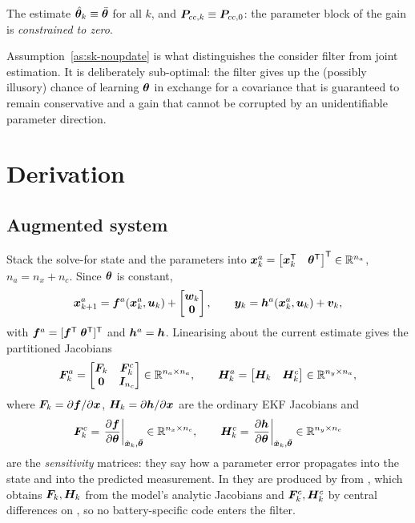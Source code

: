 \begin{assumption}\label{as:sk-noupdate}
The estimate $\hat{\bm{\theta}}_k \equiv \bar{\bm{\theta}}$ for all $k$, and
$\bm{P}_{cc,k}\equiv\bm{P}_{cc,0}$: the parameter block of the gain is \emph{constrained to zero}.
\end{assumption}

Assumption~\ref{as:sk-noupdate} is what distinguishes the consider filter from joint estimation.
It is deliberately sub-optimal: the filter gives up the (possibly illusory) chance of learning
$\bm{\theta}$ in exchange for a covariance that is guaranteed to remain conservative and a gain that
cannot be corrupted by an unidentifiable parameter direction.

\section{Derivation}

\subsection{Augmented system}
Stack the solve-for state and the parameters into
$\bm{x}^a_k = \begin{bmatrix}\bm{x}_k^{\mathsf{T}} & \bm{\theta}^{\mathsf{T}}\end{bmatrix}^{\mathsf{T}} \in \mathbb{R}^{n_a}$,
$n_a = n_x+n_c$.  Since $\bm{\theta}$ is constant,
\begin{equation}
\bm{x}^a_{k+1} = \bm{f}^a(\bm{x}^a_k,\bm{u}_k) + \begin{bmatrix}\bm{w}_k\\ \bm 0\end{bmatrix},
\qquad
\bm{y}_k = \bm{h}^a(\bm{x}^a_k,\bm{u}_k) + \bm{v}_k,
\label{eq:sk-aug}
\end{equation}
with $\bm{f}^a = [\bm{f}^{\mathsf{T}}\;\bm{\theta}^{\mathsf{T}}]^{\mathsf{T}}$ and $\bm{h}^a = \bm{h}$.  Linearising about the current estimate
gives the partitioned Jacobians
\begin{equation}
\bm{F}^a_k = \begin{bmatrix} \bm{F}_k & \bm{F}^{c}_k \\ \bm 0 & \bm{I}_{n_c}\end{bmatrix}
   \in\mathbb{R}^{n_a\times n_a},
\qquad
\bm{H}^a_k = \begin{bmatrix} \bm{H}_k & \bm{H}^{c}_k \end{bmatrix} \in\mathbb{R}^{n_y\times n_a},
\label{eq:sk-jac}
\end{equation}
where $\bm{F}_k=\partial\bm{f}/\partial\bm{x}$, $\bm{H}_k=\partial\bm{h}/\partial\bm{x}$ are the ordinary EKF
Jacobians and
\begin{equation}
\bm{F}^{c}_k = \left.\frac{\partial \bm{f}}{\partial\bm{\theta}}\right|_{\hat{\bm{x}}_k,\bar{\bm{\theta}}}
\in\mathbb{R}^{n_x\times n_c},
\qquad
\bm{H}^{c}_k = \left.\frac{\partial \bm{h}}{\partial\bm{\theta}}\right|_{\hat{\bm{x}}_k,\bar{\bm{\theta}}}
\in\mathbb{R}^{n_y\times n_c}
\label{eq:sk-sens}
\end{equation}
are the \emph{sensitivity} matrices: they say how a parameter error propagates into the state and
into the predicted measurement.  In  they are produced by
 from , which obtains $\bm{F}_k,\bm{H}_k$ from the
model's analytic Jacobians and $\bm{F}^c_k,\bm{H}^c_k$ by central differences on
, so no battery-specific code enters the filter.

